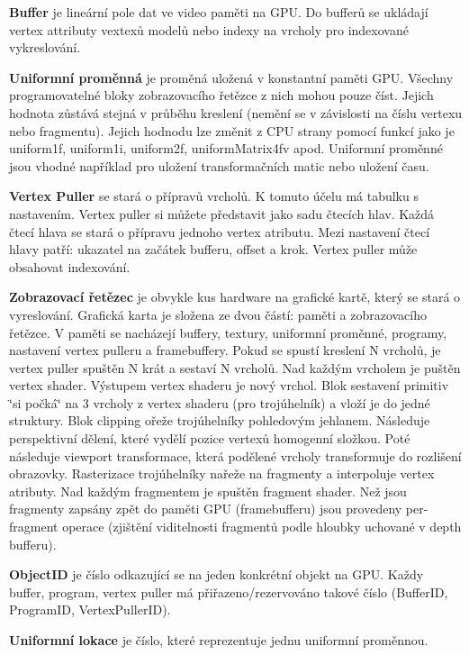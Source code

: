 {\bfseries Buffer} je lineární pole dat ve video paměti na G\-P\-U. Do bufferů se ukládají vertex attributy vextexů modelů nebo indexy na vrcholy pro indexované vykreslování.

{\bfseries Uniformní proměnná} je proměná uložená v konstantní paměti G\-P\-U. Všechny programovatelné bloky zobrazovacího řetězce z nich mohou pouze číst. Jejich hodnota zůstává stejná v průběhu kreslení (nemění se v závislosti na číslu vertexu nebo fragmentu). Jejich hodnodu lze změnit z C\-P\-U strany pomocí funkcí jako je uniform1f, uniform1i, uniform2f, uniform\-Matrix4fv apod. Uniformní proměnné jsou vhodné například pro uložení transformačních matic nebo uložení času.

{\bfseries Vertex Puller} se stará o přípravů vrcholů. K tomuto účelu má tabulku s nastavením. Vertex puller si můžete představit jako sadu čtecích hlav. Každá čtecí hlava se stará o přípravu jednoho vertex atributu. Mezi nastavení čtecí hlavy patří\-: ukazatel na začátek bufferu, offset a krok. Vertex puller může obsahovat indexování.

{\bfseries Zobrazovací řetězec} je obvykle kus hardware na grafické kartě, který se stará o vyreslování. Grafická karta je složena ze dvou částí\-: paměti a zobrazovacího řetězce. V paměti se nacházejí buffery, textury, uniformní proměnné, programy, nastavení vertex pulleru a framebuffery. Pokud se spustí kreslení N vrcholů, je vertex puller spuštěn N krát a sestaví N vrcholů. Nad každým vrcholem je puštěn vertex shader. Výstupem vertex shaderu je nový vrchol. Blok sestavení primitiv \char`\"{}si počká\char`\"{} na 3 vrcholy z vertex shaderu (pro trojúhelník) a vloží je do jedné struktury. Blok clipping ořeže trojúhelníky pohledovým jehlanem. Následuje perspektivní dělení, které vydělí pozice vertexů homogenní složkou. Poté následuje viewport transformace, která podělené vrcholy transformuje do rozlišení obrazovky. Rasterizace trojúhelníky nařeže na fragmenty a interpoluje vertex atributy. Nad každým fragmentem je spuštěn fragment shader. Než jsou fragmenty zapsány zpět do paměti G\-P\-U (framebufferu) jsou provedeny per-\/fragment operace (zjištění viditelnosti fragmentů podle hloubky uchované v depth bufferu). 

{\bfseries Object\-I\-D} je číslo odkazující se na jeden konkrétní objekt na G\-P\-U. Každy buffer, program, vertex puller má přiřazeno/rezervováno takové číslo (Buffer\-I\-D, Program\-I\-D, Vertex\-Puller\-I\-D).

{\bfseries Uniformní lokace} je číslo, které reprezentuje jednu uniformní proměnnou.

